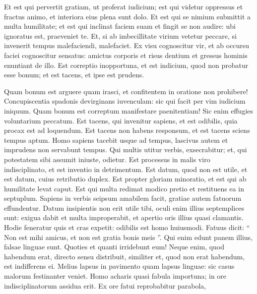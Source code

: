 \begin{biblechapter}
\begin{biblechapter}
\begin{biblechapter}
\begin{biblechapter}
\begin{biblechapter}
\begin{biblechapter}
\begin{biblechapter}
\begin{biblechapter}
\begin{biblechapter}
\begin{biblechapter}
\begin{biblechapter}
\begin{biblechapter}
\begin{biblechapter}
\begin{biblechapter}
\begin{biblechapter}
\begin{biblechapter}
\begin{biblechapter}
\begin{biblechapter}
\begin{biblechapter}
 \verse Et est qui pervertit gratiam, ut proferat iudicium;
 est qui videtur oppressus et fractus animo,
 et interiora eius plena sunt dolo.
 \verse Et est qui se nimium submittit a multa humilitate;
 et est qui inclinat faciem suam
 et fingit se non audire:
 ubi ignoratus est, praeveniet te.
 \verse Et, si ab imbecillitate virium vetetur peccare,
 si invenerit tempus malefaciendi, malefaciet.
 \verse Ex visu cognoscitur vir,
 et ab occursu faciei cognoscitur sensatus:
 \verse amictus corporis et risus dentium
 et gressus hominis enuntiant de illo.
 \verse Est correptio inopportuna,
 et est indicium, quod non probatur esse bonum;
 et est tacens, et ipse est prudens.
 
\begin{biblechapter}
\verse Quam bonum est arguere quam irasci,
 et confitentem in oratione non prohibere!
 \verse Concupiscentia spadonis devirginans iuvenculam:
 \verse sic qui facit per vim iudicium iniquum.
 \verse Quam bonum est correptum manifestare paenitentiam!
 Sic enim effugies voluntarium peccatum.
 \verse Est tacens, qui invenitur sapiens,
 et est odibilis, quia procax est ad loquendum.
 \verse Est tacens non habens responsum,
 et est tacens sciens tempus aptum.
 \verse Homo sapiens tacebit usque ad tempus,
 lascivus autem et imprudens non servabunt tempus.
 \verse Qui multis utitur verbis, exsecrabitur;
 et, qui potestatem sibi assumit iniuste, odietur.
 \verse Est processus in malis viro indisciplinato,
 et est inventio in detrimentum.
 \verse Est datum, quod non est utile,
 et est datum, cuius retributio duplex.
 \verse Est propter gloriam minoratio,
 et est qui ab humilitate levat caput.
 \verse Est qui multa redimat modico pretio
 et restituens ea in septuplum.
 \verse Sapiens in verbis seipsum amabilem facit,
 gratiae autem fatuorum effundentur.
 \verse Datum insipientis non erit utile tibi,
 oculi enim illius septemplices sunt:
 \verse exigua dabit et multa improperabit,
 et apertio oris illius quasi clamantis.
 \verse Hodie feneratur quis et cras expetit:
 odibilis est homo huiusmodi.
 \verse Fatuus dicit: “ Non est mihi amicus,
 et non est gratia bonis meis ”.
 \verse Qui enim edunt panem illius, falsae linguae sunt.
 Quoties et quanti irridebunt eum!
 \verse Neque enim, quod habendum erat, directo sensu distribuit,
 similiter et, quod non erat habendum, est indifferens ei.
 \verse Melius lapsus in pavimento quam lapsus linguae:
 sic casus malorum festinanter veniet.
 \verse Homo acharis quasi fabula importuna;
 in ore indisciplinatorum assidua erit.
 \verse Ex ore fatui reprobabitur parabola,

\end{biblechapter}
\end{biblechapter}
\end{biblechapter}
\end{biblechapter}
\end{biblechapter}
\end{biblechapter}
\end{biblechapter}
\end{biblechapter}
\end{biblechapter}
\end{biblechapter}
\end{biblechapter}
\end{biblechapter}
\end{biblechapter}
\end{biblechapter}
\end{biblechapter}
\end{biblechapter}
\end{biblechapter}
\end{biblechapter}
\end{biblechapter}
\end{biblechapter}
